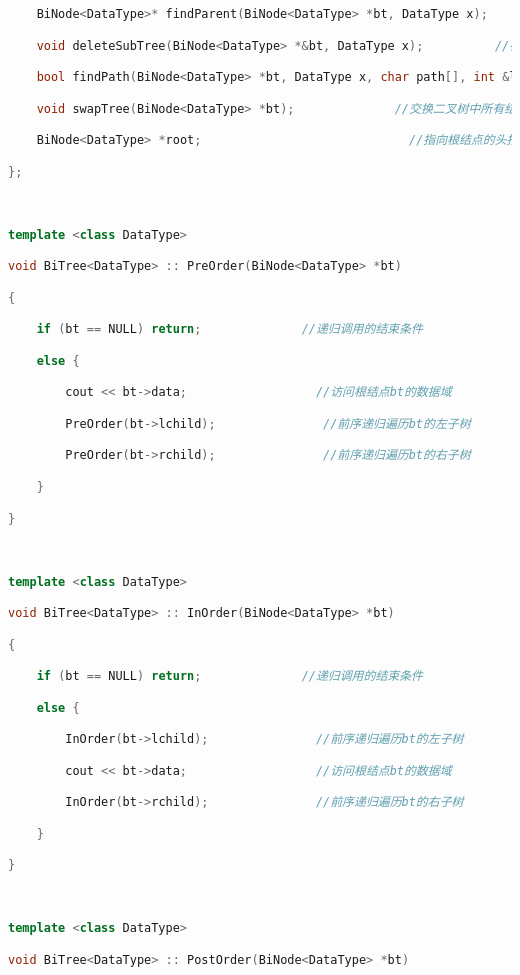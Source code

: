 \begin{lstlisting}[language=C++]
    BiNode<DataType>* findParent(BiNode<DataType> *bt, DataType x);             //求二叉树中结点×的双亲

    void deleteSubTree(BiNode<DataType> *&bt, DataType x);          //在二叉树中删除以值×为根结点的子树

    bool findPath(BiNode<DataType> *bt, DataType x, char path[], int &len);              //求从根结点到p所指结点之间的路径

    void swapTree(BiNode<DataType> *bt);              //交换二叉树中所有结点的左右子树

    BiNode<DataType> *root;                             //指向根结点的头指针

};

  

template <class DataType>

void BiTree<DataType> :: PreOrder(BiNode<DataType> *bt)

{

    if (bt == NULL) return;              //递归调用的结束条件

    else {

        cout << bt->data;                  //访问根结点bt的数据域

        PreOrder(bt->lchild);               //前序递归遍历bt的左子树

        PreOrder(bt->rchild);               //前序递归遍历bt的右子树  

    }

}

  

template <class DataType>

void BiTree<DataType> :: InOrder(BiNode<DataType> *bt)

{

    if (bt == NULL) return;              //递归调用的结束条件

    else {

        InOrder(bt->lchild);               //前序递归遍历bt的左子树

        cout << bt->data;                  //访问根结点bt的数据域

        InOrder(bt->rchild);               //前序递归遍历bt的右子树  

    }

}

  

template <class DataType>

void BiTree<DataType> :: PostOrder(BiNode<DataType> *bt)


\end{lstlisting}
